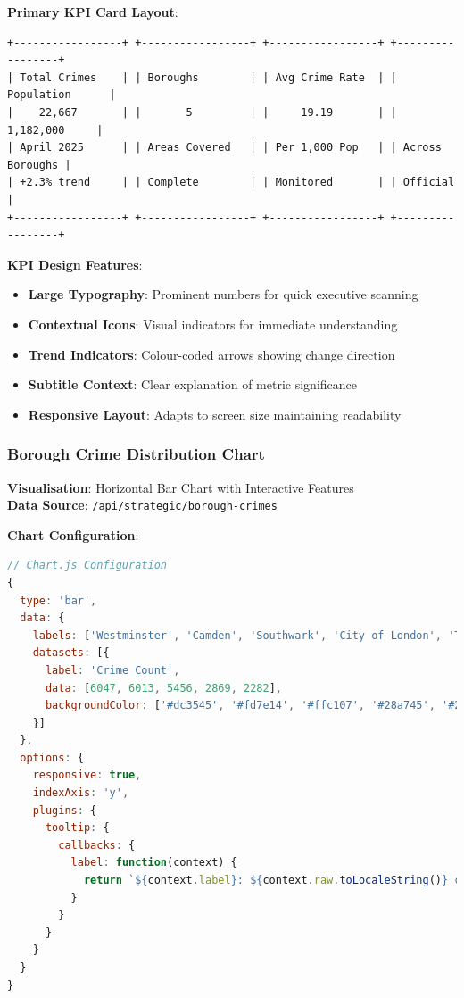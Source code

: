 \documentclass[12pt,a4paper]{article}
\begin{document}
\textbf{Primary KPI Card Layout}:
\begin{verbatim}
+-----------------+ +-----------------+ +-----------------+ +-----------------+
| Total Crimes    | | Boroughs        | | Avg Crime Rate  | | Population      |
|    22,667       | |       5         | |     19.19       | |   1,182,000     |
| April 2025      | | Areas Covered   | | Per 1,000 Pop   | | Across Boroughs |
| +2.3% trend     | | Complete        | | Monitored       | | Official        |
+-----------------+ +-----------------+ +-----------------+ +-----------------+
\end{verbatim}

\textbf{KPI Design Features}:
\begin{itemize}
    \item \textbf{Large Typography}: Prominent numbers for quick executive scanning
    \item \textbf{Contextual Icons}: Visual indicators for immediate understanding
    \item \textbf{Trend Indicators}: Colour-coded arrows showing change direction
    \item \textbf{Subtitle Context}: Clear explanation of metric significance
    \item \textbf{Responsive Layout}: Adapts to screen size maintaining readability
\end{itemize}

\subsubsection{Borough Crime Distribution Chart}

\textbf{Visualisation}: Horizontal Bar Chart with Interactive Features\\
\textbf{Data Source}: \texttt{/api/strategic/borough-crimes}

\textbf{Chart Configuration}:
\begin{lstlisting}[language=JavaScript]
// Chart.js Configuration
{
  type: 'bar',
  data: {
    labels: ['Westminster', 'Camden', 'Southwark', 'City of London', 'Tower Hamlets'],
    datasets: [{
      label: 'Crime Count',
      data: [6047, 6013, 5456, 2869, 2282],
      backgroundColor: ['#dc3545', '#fd7e14', '#ffc107', '#28a745', '#20c997']
    }]
  },
  options: {
    responsive: true,
    indexAxis: 'y',
    plugins: {
      tooltip: {
        callbacks: {
          label: function(context) {
            return `${context.label}: ${context.raw.toLocaleString()} crimes`;
          }
        }
      }
    }
  }
}
\end{lstlisting}
\end{document}
